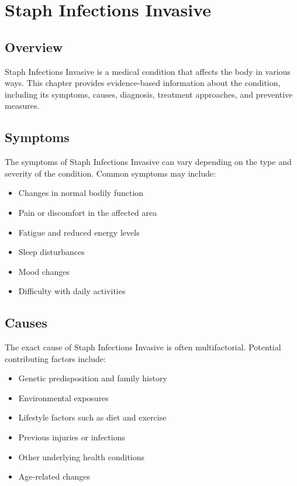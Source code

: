 \chapter{Staph Infections Invasive}

\section*{Overview}
Staph Infections Invasive is a medical condition that affects the body in various ways. This chapter provides evidence-based information about the condition, including its symptoms, causes, diagnosis, treatment approaches, and preventive measures.

\section*{Symptoms}
The symptoms of Staph Infections Invasive can vary depending on the type and severity of the condition. Common symptoms may include:

\begin{itemize}
\item Changes in normal bodily function
\item Pain or discomfort in the affected area
\item Fatigue and reduced energy levels
\item Sleep disturbances
\item Mood changes
\item Difficulty with daily activities
\end{itemize}

\section*{Causes}
The exact cause of Staph Infections Invasive is often multifactorial. Potential contributing factors include:

\begin{itemize}
\item Genetic predisposition and family history
\item Environmental exposures
\item Lifestyle factors such as diet and exercise
\item Previous injuries or infections
\item Other underlying health conditions
\item Age-related changes
\end{itemize}

